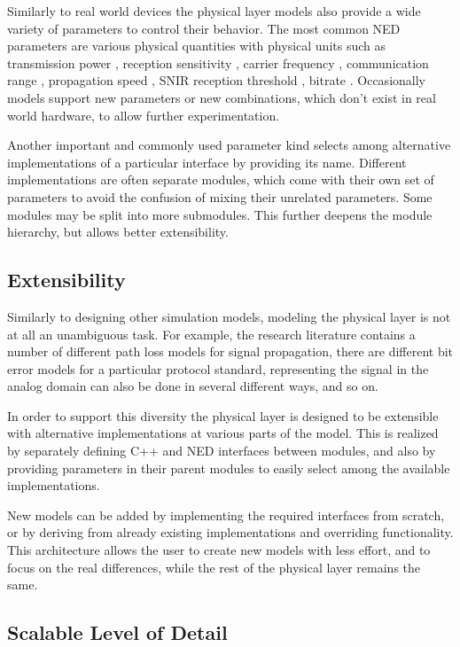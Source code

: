Similarly to real world devices the physical layer models also provide a wide
variety of parameters to control their behavior. The most common NED parameters
are various physical quantities with physical units such as transmission power
\ttt{[W]}, reception sensitivity \ttt{[W]}, carrier frequency \ttt{[Hz]},
communication range \ttt{[m]}, propagation speed \ttt{[m/s]}, SNIR reception
threshold \ttt{[dB]}, bitrate \ttt{[b/s]}. Occasionally models support new
parameters or new combinations, which don't exist in real world hardware, to
allow further experimentation.

Another important and commonly used parameter kind selects among alternative
implementations of a particular interface by providing its name. Different
implementations are often separate modules, which come with their own set of
parameters to avoid the confusion of mixing their unrelated parameters. Some
modules may be split into more submodules. This further deepens the module
hierarchy, but allows better extensibility.

\subsection{Extensibility}

Similarly to designing other simulation models, modeling the physical layer is
not at all an unambiguous task. For example, the research literature contains a
number of different path loss models for signal propagation, there are different
bit error models for a particular protocol standard, representing the signal in
the analog domain can also be done in several different ways, and so on.

In order to support this diversity the physical layer is designed to be
extensible with alternative implementations at various parts of the model. This
is realized by separately defining C++ and NED interfaces between modules, and
also by providing parameters in their parent modules to easily select among the
available implementations.

New models can be added by implementing the required interfaces from scratch, or
by deriving from already existing implementations and overriding functionality.
This architecture allows the user to create new models with less effort, and to
focus on the real differences, while the rest of the physical layer remains the
same.

\subsection{Scalable Level of Detail}

